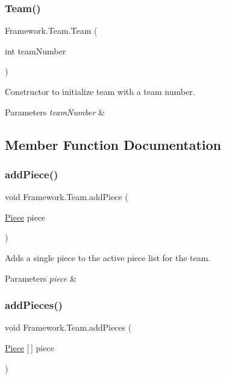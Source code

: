 \subsubsection{\texorpdfstring{Team()}{Team()}}
{\footnotesize\ttfamily Framework.\+Team.\+Team (\begin{DoxyParamCaption}\item[{int}]{team\+Number }\end{DoxyParamCaption})}

Constructor to initialize team with a team number. 
\begin{DoxyParams}{Parameters}
{\em team\+Number} & \\
\hline
\end{DoxyParams}


\subsection{Member Function Documentation}
\hypertarget{class_framework_1_1_team_a0bc8fa20d6f085f3d85679f1d1e3c203}{}\label{class_framework_1_1_team_a0bc8fa20d6f085f3d85679f1d1e3c203} 
\subsubsection{\texorpdfstring{add\+Piece()}{addPiece()}}
{\footnotesize\ttfamily void Framework.\+Team.\+add\+Piece (\begin{DoxyParamCaption}\item[{\hyperlink{class_framework_1_1_pieces_1_1_piece}{Piece}}]{piece }\end{DoxyParamCaption})}

Adds a single piece to the active piece list for the team. 
\begin{DoxyParams}{Parameters}
{\em piece} & \\
\hline
\end{DoxyParams}
\hypertarget{class_framework_1_1_team_a7bff66a597d19c0b3e528ddcbec1cb2f}{}\label{class_framework_1_1_team_a7bff66a597d19c0b3e528ddcbec1cb2f} 
\subsubsection{\texorpdfstring{add\+Pieces()}{addPieces()}}
{\footnotesize\ttfamily void Framework.\+Team.\+add\+Pieces (\begin{DoxyParamCaption}\item[{\hyperlink{class_framework_1_1_pieces_1_1_piece}{Piece} \mbox{[}$\,$\mbox{]}}]{piece }\end{DoxyParamCaption})}

